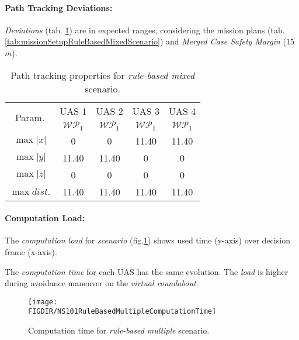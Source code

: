 \paragraph{Path Tracking Deviations:} \emph{Deviations} (tab. \ref{tab:pathTrackingParametersForRuleBasedMixed}) are in expected ranges, considering the mission plans (tab. \ref{tab:missionSetupRuleBasedMixedScenario}) and \emph{Merged Case Safety Margin} ($15$ $m$).

\begin{table}[H]
	\centering
	\begin{tabular}{c||c|c|c|c}
		\multirow{2}{*}{Param.} & UAS 1     & UAS 2             & UAS 3             & UAS 4 \\\cline{2-5}
						& $\mathscr{WP}_1$  & $\mathscr{WP}_1$  & $\mathscr{WP}_1$  & $\mathscr{WP}_1$ \\\hline\hline
		  $\max |x|$    & 0                 & 0                 & 11.40             & 11.40\\\hline
		  $\max |y|$    & 11.40             & 11.40             & 0                 & 0\\\hline
		  $\max |z|$    & 0                 & 0                 & 0                 & 0\\\hline
		  $\max dist.$  & 11.40             & 11.40             & 11.40              & 11.40\\
	\end{tabular}
	\caption{Path tracking properties for \emph{rule-based mixed} scenario.}
	\label{tab:pathTrackingParametersForRuleBasedMixed}
\end{table}


\paragraph{Computation Load:} The \emph{computation load} for \emph{scenario} (fig.\ref{fig:ruleBasedMultipleComputationTime}) shows used time (y-axis) over decision frame (x-axis).

The \emph{computation time} for each UAS has the same evolution. The \emph{load} is higher  during avoidance maneuver on the \emph{virtual roundabout}.

\begin{figure}[H]
\centering
\texttt{[image: \\FIGDIR/NS101RuleBasedMultipleComputationTime]} 
\caption{Computation time for \emph{rule-based multiple} scenario.}
\label{fig:ruleBasedMultipleComputationTime}
\end{figure}